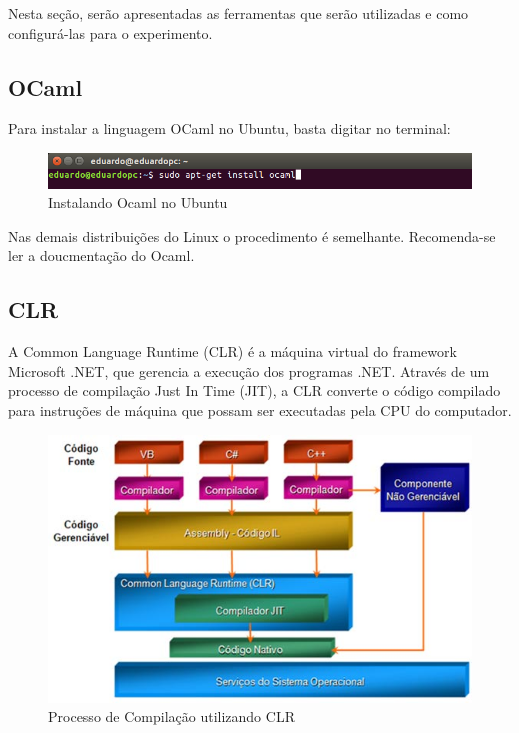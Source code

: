 \documentclass[hidelinks,12pt]{article}
\begin{document}
	Nesta seção, serão apresentadas as ferramentas que serão utilizadas e como configurá-las para o experimento.
	
	\subsection{OCaml}
		
	Para instalar a linguagem OCaml no Ubuntu, basta digitar no terminal:\\
	
	\begin{figure}[h!]
		\centering
		\includegraphics[scale=0.5]{Figures/InstalarOcaml}
		\caption{Instalando Ocaml no Ubuntu}
	\end{figure}
	
	
	Nas demais distribuições do Linux o procedimento é semelhante. Recomenda-se ler a doucmentação do Ocaml.
	
	\subsection{CLR}
	
	
	A Common Language Runtime (CLR) é a máquina virtual do framework Microsoft .NET, que gerencia a execução dos programas .NET. Através de um processo de compilação Just In Time (JIT), a CLR converte o código compilado para instruções de máquina que possam ser executadas pela CPU do computador.
	
	\begin{figure}[h!]
		\centering
		\includegraphics[scale=0.5]{Figures/ProcessoCompilacaoCLR}
		\caption{Processo de Compilação utilizando CLR}
	\end{figure}
	
\end{document}
